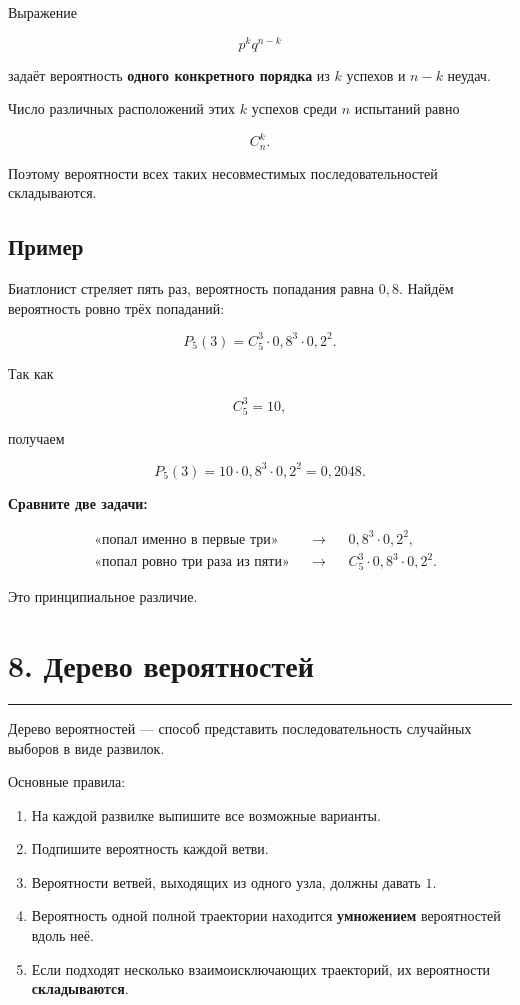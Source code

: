 \documentclass[a4paper,12pt]{article}
\newcommand{\accentline}{%
    \vspace{0.3em}
    {\color{accent}\rule{\linewidth}{0.7pt}}
    \vspace{0.5em}
}
\newcommand{\important}[1]{\textbf{\color{darkaccent}#1}}
\begin{document}
Выражение

\[
p^kq^{n-k}
\]

задаёт вероятность \important{одного конкретного порядка} из $k$ успехов и
$n-k$ неудач.

Число различных расположений этих $k$ успехов среди $n$ испытаний равно

\[
C_n^k.
\]

Поэтому вероятности всех таких несовместимых последовательностей
складываются.

\subsection*{Пример}

Биатлонист стреляет пять раз, вероятность попадания равна $0,8$.
Найдём вероятность ровно трёх попаданий:

\[
P_5(3)
=
C_5^3
\cdot
0,8^3
\cdot
0,2^2.
\]

Так как

\[
C_5^3=10,
\]

получаем

\[
P_5(3)
=
10\cdot0,8^3\cdot0,2^2
=
0,2048.
\]

\important{Сравните две задачи:}

\[
\begin{aligned}
&\text{«попал именно в первые три»}
&&\longrightarrow
&&0,8^3\cdot0,2^2,
\\[2mm]
&\text{«попал ровно три раза из пяти»}
&&\longrightarrow
&&C_5^3\cdot0,8^3\cdot0,2^2.
\end{aligned}
\]

Это принципиальное различие.


\section*{\color{darkaccent}8. Дерево вероятностей}
\accentline

Дерево вероятностей --- способ представить последовательность случайных
выборов в виде развилок.

Основные правила:

\begin{enumerate}
    \item На каждой развилке выпишите все возможные варианты.
    \item Подпишите вероятность каждой ветви.
    \item Вероятности ветвей, выходящих из одного узла, должны давать $1$.
    \item Вероятность одной полной траектории находится
    \important{умножением} вероятностей вдоль неё.
    \item Если подходят несколько взаимоисключающих траекторий, их
    вероятности \important{складываются}.
\end{enumerate}
\end{document}
